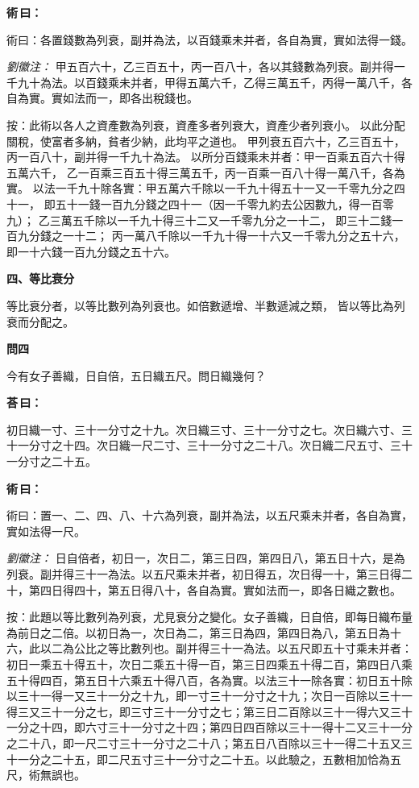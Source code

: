 \documentclass[11pt,a4paper]{article}
\newenvironment{problem}[1][]{%
  \par\vspace{0.6em}\noindent\textcolor{problemcolor}{\textbf{問\ignorespaces#1\unskip}\hspace{0.5em}}%
  \ignorespaces
}{\par\vspace{0.4em}}
\newenvironment{answer}{%
  \par\noindent\textcolor{answercolor}{\textbf{荅\,曰：}}%
  \ignorespaces
}{\par\vspace{0.3em}}
\newenvironment{method}{%
  \par\noindent\textcolor{methodcolor}{\textbf{術\,曰：}}%
  \ignorespaces
}{\par\vspace{0.4em}}
\newenvironment{liuhuicomm}{%
  \par\vspace{0.3em}\noindent\textcolor{commentarycolor}{\small\textit{劉徽注：}}}%
  {\par\vspace{0.5em}}
\begin{document}
\begin{method}
術曰：各置錢數為列衰，副并為法，以百錢乘未并者，各自為實，實如法得一錢。
\end{method}

\begin{liuhuicomm}
甲五百六十，乙三百五十，丙一百八十，各以其錢數為列衰。副并得一千九十為法。以百錢乘未并者，甲得五萬六千，乙得三萬五千，丙得一萬八千，各自為實。實如法而一，即各出稅錢也。

按：此術以各人之資產數為列衰，資產多者列衰大，資產少者列衰小。
以此分配關稅，使富者多納，貧者少納，此均平之道也。
甲列衰五百六十，乙三百五十，丙一百八十，副并得一千九十為法。
以所分百錢乘未并者：甲一百乘五百六十得五萬六千，
乙一百乘三百五十得三萬五千，丙一百乘一百八十得一萬八千，各為實。
以法一千九十除各實：甲五萬六千除以一千九十得五十一又一千零九分之四十一，
即五十一錢一百九分錢之四十一（因一千零九約去公因數九，得一百零九）；
乙三萬五千除以一千九十得三十二又一千零九分之一十二，
即三十二錢一百九分錢之一十二；
丙一萬八千除以一千九十得一十六又一千零九分之五十六，
即一十六錢一百九分錢之五十六。
\end{liuhuicomm}

\vspace{0.8em}
\noindent\textbf{\large 四、等比衰分}
\vspace{0.5em}

\noindent 等比衰分者，以等比數列為列衰也。如倍數遞增、半數遞減之類，
皆以等比為列衰而分配之。

\begin{problem}[四]
今有女子善織，日自倍，五日織五尺。問日織幾何？
\end{problem}

\begin{answer}
初日織一寸、三十一分寸之十九。次日織三寸、三十一分寸之七。次日織六寸、三十一分寸之十四。次日織一尺二寸、三十一分寸之二十八。次日織二尺五寸、三十一分寸之二十五。
\end{answer}

\begin{method}
術曰：置一、二、四、八、十六為列衰，副并為法，以五尺乘未并者，各自為實，實如法得一尺。
\end{method}

\begin{liuhuicomm}
日自倍者，初日一，次日二，第三日四，第四日八，第五日十六，是為列衰。副并得三十一為法。以五尺乘未并者，初日得五，次日得一十，第三日得二十，第四日得四十，第五日得八十，各自為實。實如法而一，即各日織之數也。

按：此題以等比數列為列衰，尤見衰分之變化。女子善織，日自倍，即每日織布量為前日之二倍。以初日為一，次日為二，第三日為四，第四日為八，第五日為十六，此以二為公比之等比數列也。副并得三十一為法。以五尺即五十寸乘未并者：初日一乘五十得五十，次日二乘五十得一百，第三日四乘五十得二百，第四日八乘五十得四百，第五日十六乘五十得八百，各為實。以法三十一除各實：初日五十除以三十一得一又三十一分之十九，即一寸三十一分寸之十九；次日一百除以三十一得三又三十一分之七，即三寸三十一分寸之七；第三日二百除以三十一得六又三十一分之十四，即六寸三十一分寸之十四；第四日四百除以三十一得十二又三十一分之二十八，即一尺二寸三十一分寸之二十八；第五日八百除以三十一得二十五又三十一分之二十五，即二尺五寸三十一分寸之二十五。以此驗之，五數相加恰為五尺，術無誤也。
\end{liuhuicomm}
\end{document}
